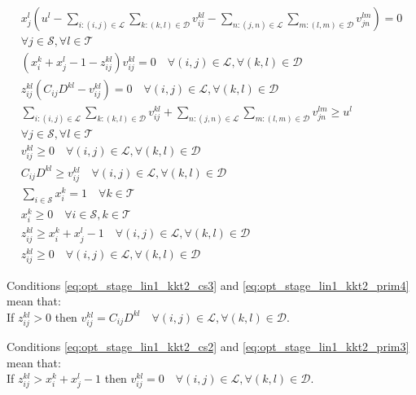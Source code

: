 \begin{subequations}\label{eq:opt_stage_lin1_kkt2}
	\begin{align}
		x_j^l\left(u^l-\sum_{i:(i,j)\in\mathcal{L}}\sum_{k:(k,l)\in\mathcal{D}}v_{ij}^{kl}-\sum_{n:(j,n)\in\mathcal{L}}\sum_{m:(l,m)\in\mathcal{D}}v_{jn}^{lm}\right) = 0 \nonumber \\
		\forall j\in\mathcal{S},\forall l\in\mathcal{T} \label{eq:opt_stage_lin1_kkt2_cs1} \\
		(x_i^k+x_j^l-1-z_{ij}^{kl})v_{ij}^{kl} = 0 \quad \forall (i,j)\in\mathcal{L}, \forall(k,l)\in\mathcal{D} \label{eq:opt_stage_lin1_kkt2_cs2}\\
		z_{ij}^{kl}\left(C_{ij}D^{kl}-v_{ij}^{kl}\right) = 0 \quad \forall (i,j)\in\mathcal{L}, \forall(k,l)\in\mathcal{D} \label{eq:opt_stage_lin1_kkt2_cs3} \\
		\sum_{i:(i,j)\in\mathcal{L}}\sum_{k:(k,l)\in\mathcal{D}}v_{ij}^{kl}+\sum_{n:(j,n)\in\mathcal{L}}\sum_{m:(l,m)\in\mathcal{D}}v_{jn}^{lm} \geq u^l \nonumber \\
		\forall j\in\mathcal{S},\forall l\in\mathcal{T} \label{eq:opt_stage_lin1_kkt2_dual1} \\
		v_{ij}^{kl} \geq 0 \quad \forall (i,j)\in\mathcal{L}, \forall(k,l)\in\mathcal{D} \label{eq:opt_stage_lin1_kkt2_dual2} \\
		C_{ij}D^{kl} \geq v_{ij}^{kl} \quad \forall (i,j)\in\mathcal{L}, \forall(k,l)\in\mathcal{D} \label{eq:opt_stage_lin1_kkt2_dual3} \\
		\sum_{i\in\mathcal{S}}x_i^k = 1 \quad \forall k\in\mathcal{T} \label{eq:opt_stage_lin1_kkt2_prim1} \\
		x_i^k \geq 0 \quad \forall i\in\mathcal{S},k\in\mathcal{T} \label{eq:opt_stage_lin1_kkt2_prim2} \\
		z_{ij}^{kl} \geq x_i^k+x_j^l-1 \quad \forall (i,j)\in\mathcal{L}, \forall(k,l)\in\mathcal{D} \label{eq:opt_stage_lin1_kkt2_prim3} \\
		z_{ij}^{kl} \geq 0 \quad \forall (i,j)\in\mathcal{L}, \forall(k,l)\in\mathcal{D} \label{eq:opt_stage_lin1_kkt2_prim4}
	\end{align}
\end{subequations}

Conditions \eqref{eq:opt_stage_lin1_kkt2_cs3} and \eqref{eq:opt_stage_lin1_kkt2_prim4} mean that:\\
If $z_{ij}^{kl}>0$ then $v_{ij}^{kl}=C_{ij}D^{kl} \quad \forall (i,j)\in\mathcal{L}, \forall(k,l)\in\mathcal{D}$.

Conditions \eqref{eq:opt_stage_lin1_kkt2_cs2} and \eqref{eq:opt_stage_lin1_kkt2_prim3} mean that:\\
If $z_{ij}^{kl}>x_i^k+x_j^l-1$ then $v_{ij}^{kl}=0 \quad \forall (i,j)\in\mathcal{L}, \forall(k,l)\in\mathcal{D}$.

